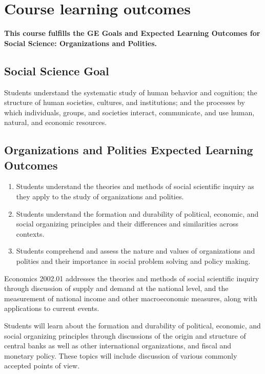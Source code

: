 \documentclass[12pt]{article}
\begin{document}
\newpage

\section*{Course learning outcomes}

\textbf{This course fulfills the GE Goals and Expected Learning Outcomes for Social Science: Organizations and Polities.}

\subsection*{Social Science Goal}

Students understand the systematic study of human behavior and cognition; the structure of human societies, cultures, and institutions; and the processes by which individuals, groups, and societies interact, communicate, and use human, natural, and economic resources.

\subsection*{Organizations and Polities Expected Learning Outcomes}
\begin{enumerate}
    \item Students understand the theories and methods of social scientific inquiry as they apply to the study of organizations and polities.
    \item Students understand the formation and durability of political, economic, and social organizing principles and their differences and similarities across contexts.
    \item Students comprehend and assess the nature and values of organizations and polities and their importance in social problem solving and policy making.
\end{enumerate}

Economics 2002.01 addresses the theories and methods of social scientific inquiry through discussion of supply and demand at the national level, and the measurement of national income and other macroeconomic measures, along with applications to current events.

Students will learn about the formation and durability of political, economic, and social organizing principles through discussions of the origin and structure of central banks as well as other international organizations, and fiscal and monetary policy. These topics will include discussion of various commonly accepted points of view.
\end{document}
